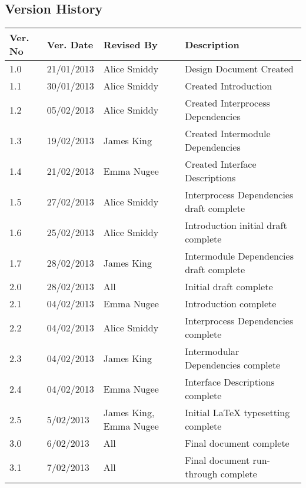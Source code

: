 \subsection{Version History}

{
    \def\Version#1#2#3#4{\hline #1 & #2 & #3 & #4 \\}
    \def\Header#1{\bf\small #1}

    {\footnotesize
        \renewcommand{\arraystretch}{1.5}
        \begin{tabularx}{\textwidth}{|l|l|l|X|}
            \hline
            \Header{Ver. No} &
            \Header{Ver. Date} &
            \Header{Revised By} &
            \Header{Description} \\

            \Version{1.0}{21/01/2013}{Alice Smiddy}{Design Document Created}
            \Version{1.1}{30/01/2013}{Alice Smiddy}{Created Introduction}
            \Version{1.2}{05/02/2013}{Alice Smiddy}{Created Interprocess Dependencies}
            \Version{1.3}{19/02/2013}{James King}{Created Intermodule Dependencies}
            \Version{1.4}{21/02/2013}{Emma Nugee}{Created Interface Descriptions}
            \Version{1.5}{27/02/2013}{Alice Smiddy}{Interprocess Dependencies draft complete}
            \Version{1.6}{25/02/2013}{Alice Smiddy}{Introduction initial draft complete}
            \Version{1.7}{28/02/2013}{James King}{Intermodule Dependencies draft complete}
            \Version{2.0}{28/02/2013}{All}{Initial draft complete}
            \Version{2.1}{04/02/2013}{Emma Nugee}{Introduction complete}
            \Version{2.2}{04/02/2013}{Alice Smiddy}{Interprocess Dependencies complete}
            \Version{2.3}{04/02/2013}{James King}{Intermodular Dependencies complete}
            \Version{2.4}{04/02/2013}{Emma Nugee}{Interface Descriptions complete}
            \Version{2.5}{5/02/2013}{James King, Emma Nugee}{Initial LaTeX typesetting complete}
            \Version{3.0}{6/02/2013}{All}{Final document complete}
            \Version{3.1}{7/02/2013}{All}{Final document run-through complete}
            \hline
        \end{tabularx}
    }
}
